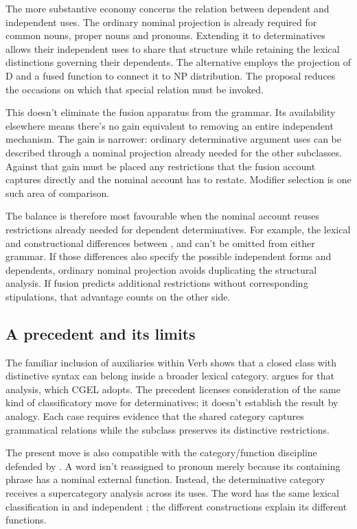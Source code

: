 \documentclass[12pt]{article}
\begin{document}
The more substantive economy concerns the relation between dependent and independent uses. The ordinary nominal projection is already required for common nouns, proper nouns and pronouns. Extending it to determinatives allows their independent uses to share that structure while retaining the lexical distinctions governing their dependents. The alternative employs the projection of D and a fused function to connect it to NP distribution. The proposal reduces the occasions on which that special relation must be invoked.

This doesn't eliminate the fusion apparatus from the grammar. Its availability elsewhere means there's no gain equivalent to removing an entire independent mechanism. The gain is narrower: ordinary determinative argument uses can be described through a nominal projection already needed for the other subclasses. Against that gain must be placed any restrictions that the fusion account captures directly and the nominal account has to restate. Modifier selection is one such area of comparison.

The balance is therefore most favourable when the nominal account reuses restrictions already needed for dependent determinatives. For example, the lexical and constructional differences between ,  and  can't be omitted from either grammar. If those differences also specify the possible independent forms and dependents, ordinary nominal projection avoids duplicating the structural analysis. If fusion predicts additional restrictions without corresponding stipulations, that advantage counts on the other side.

\subsection{A precedent and its limits}

The familiar inclusion of auxiliaries within Verb shows that a closed class with distinctive syntax can belong inside a broader lexical category. \textcite{pullumwilson1977} argues for that analysis, which CGEL adopts. The precedent licenses consideration of the same kind of classificatory move for determinatives; it doesn't establish the result by analogy. Each case requires evidence that the shared category captures grammatical relations while the subclass preserves its distinctive restrictions.

The present move is also compatible with the category/function discipline defended by \textcite{payne2010,pullummiller2022nps}. A word isn't reassigned to pronoun merely because its containing phrase has a nominal external function. Instead, the determinative category receives a supercategory analysis across its uses. The word  has the same lexical classification in  and independent ; the different constructions explain its different functions.
\end{document}
